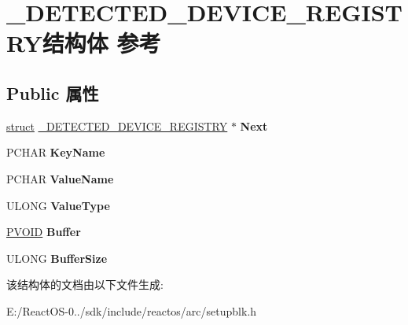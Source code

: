 \hypertarget{struct___d_e_t_e_c_t_e_d___d_e_v_i_c_e___r_e_g_i_s_t_r_y}{}\section{\+\_\+\+D\+E\+T\+E\+C\+T\+E\+D\+\_\+\+D\+E\+V\+I\+C\+E\+\_\+\+R\+E\+G\+I\+S\+T\+R\+Y结构体 参考}
\label{struct___d_e_t_e_c_t_e_d___d_e_v_i_c_e___r_e_g_i_s_t_r_y}
\subsection*{Public 属性}
\begin{DoxyCompactItemize}
\item 
\mbox{\label{struct___d_e_t_e_c_t_e_d___d_e_v_i_c_e___r_e_g_i_s_t_r_y_a891ebf5d4dc6ef127d007413317b5a08}} 
\hyperlink{interfacestruct}{struct} \hyperlink{struct___d_e_t_e_c_t_e_d___d_e_v_i_c_e___r_e_g_i_s_t_r_y}{\+\_\+\+D\+E\+T\+E\+C\+T\+E\+D\+\_\+\+D\+E\+V\+I\+C\+E\+\_\+\+R\+E\+G\+I\+S\+T\+RY} $\ast$ {\bfseries Next}
\item 
\mbox{\label{struct___d_e_t_e_c_t_e_d___d_e_v_i_c_e___r_e_g_i_s_t_r_y_a5bdcb734c153f0d22ca5c7648ab64764}} 
P\+C\+H\+AR {\bfseries Key\+Name}
\item 
\mbox{\label{struct___d_e_t_e_c_t_e_d___d_e_v_i_c_e___r_e_g_i_s_t_r_y_aaa0c29f2c090e7d22c94ae4890f14fd6}} 
P\+C\+H\+AR {\bfseries Value\+Name}
\item 
\mbox{\label{struct___d_e_t_e_c_t_e_d___d_e_v_i_c_e___r_e_g_i_s_t_r_y_ae710e17a72cec504d663e81177bd52a8}} 
U\+L\+O\+NG {\bfseries Value\+Type}
\item 
\mbox{\label{struct___d_e_t_e_c_t_e_d___d_e_v_i_c_e___r_e_g_i_s_t_r_y_a48dce448cf661cc89886aa138f53b3b5}} 
\hyperlink{interfacevoid}{P\+V\+O\+ID} {\bfseries Buffer}
\item 
\mbox{\label{struct___d_e_t_e_c_t_e_d___d_e_v_i_c_e___r_e_g_i_s_t_r_y_a540a70d2707c4f4fcf60f61fc45a25bb}} 
U\+L\+O\+NG {\bfseries Buffer\+Size}
\end{DoxyCompactItemize}


该结构体的文档由以下文件生成\+:\begin{DoxyCompactItemize}
\item 
E\+:/\+React\+O\+S-\/0../sdk/include/reactos/arc/setupblk.\+h\end{DoxyCompactItemize}
